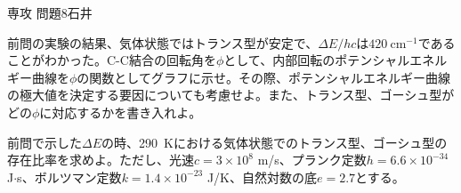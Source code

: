 \documentclass[fleqn]{jbook}
\begin{document}
\begin{question}{専攻 問題8}{石井}
\begin{subquestions}
\begin{subsubquestions}
\SubSubQuestion
前問の実験の結果、気体状態ではトランス型が安定で、$\Delta E/hc$は$420~\text{cm}^{-1}$であることがわかった。C-C結合の回転角を$\phi$として、内部回転のポテンシャルエネルギー曲線を$\phi$の関数としてグラフに示せ。その際、ポテンシャルエネルギー曲線の極大値を決定する要因についても考慮せよ。また、トランス型、ゴーシュ型がどの$\phi$に対応するかを書き入れよ。

\SubSubQuestion
前問で示した$\Delta E$の時、290~Kにおける気体状態でのトランス型、ゴーシュ型の存在比率を求めよ。ただし、光速$c=3 \times 10^{8}$ m/s、プランク定数$h=6.6 \times 10 ^{-34}$ J$\cdot$s、ボルツマン定数$k=1.4 \times 10 ^{-23}$ J/K、自然対数の底$e=2.7$とする。
\end{subsubquestions}
\end{subquestions}

\end{question}
\end{document}
